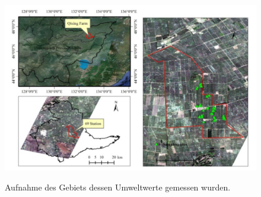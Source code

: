 \begin{figure}[h]
 \includegraphics[scale=0.4,natwidth=\textwidth]{figures/sensors/satellite_area.png}
 \centering
 \label{fig:fmishierarchy}
 \caption{Aufnahme des Gebiets dessen Umweltwerte gemessen wurden. \cite{jour:Huang2013}}
\end{figure}
